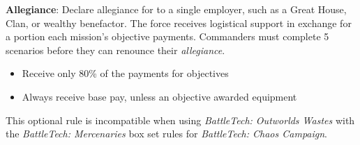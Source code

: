 \item {\bfseries Allegiance}: Declare allegiance for to a single employer, such as a Great House, Clan, or wealthy benefactor.
The force receives logistical support in exchange for a portion each mission's objective payments.
Commanders must complete 5 scenarios before they can renounce their \emph{allegiance}.

\begin{itemize}

\item Receive only 80\% of the payments for objectives

\item Always receive base pay, unless an objective awarded equipment

\end{itemize}

This optional rule is incompatible when using \emph{BattleTech: Outworlds Wastes} with the \emph{BattleTech: Mercenaries} box set rules for \emph{BattleTech: Chaos Campaign}. 
